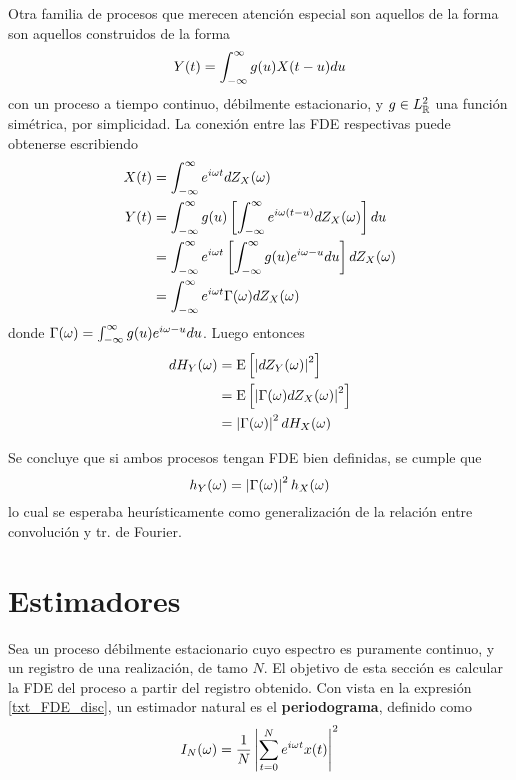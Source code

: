 Otra familia de procesos que merecen atención especial son aquellos de la forma son aquellos 
construidos de la forma
\begin{equation}
Y(t) = \int_{-\infty}^{\infty} g(u) X(t-u) du
\end{equation}
%
con \xt un proceso a tiempo continuo, débilmente estacionario, y $g\in L^{2}_{\mathbb{R}}$ una función 
simétrica, por simplicidad. 
%
La conexión entre las FDE respectivas puede obtenerse escribiendo
\begin{align*}
X(t) &= \int_{-\infty}^{\infty} e^{i \omega t }  dZ_X(\omega) \\
Y(t) &= \int_{-\infty}^{\infty} g(u) \left[ \int_{-\infty}^{\infty} e^{i \omega (t-u) }  dZ_X(\omega) \right] du \\
&= \int_{-\infty}^{\infty} e^{i \omega t } \left[ \int_{-\infty}^{\infty} g(u) e^{i \omega -u } du \right] dZ_X(\omega) \\
&= \int_{-\infty}^{\infty} e^{i \omega t } \Gamma(\omega) dZ_X(\omega)
\end{align*}
donde $\Gamma(\omega) = \int_{-\infty}^{\infty} g(u) e^{i \omega -u } du$. 
%
Luego entonces
\begin{align*}
dH_Y(\omega) &= \mathrm{E}\left[ \left| dZ_Y(\omega) \right|^{2} \right]  \\
&= \mathrm{E}\left[ \left| \Gamma(\omega) dZ_X(\omega) \right|^{2} \right]  \\
&= \left| \Gamma(\omega) \right|^{2} dH_X(\omega)
\end{align*}

Se concluye que si ambos procesos tengan FDE bien definidas, se cumple que
\begin{equation}
h_Y(\omega) = \left| \Gamma(\omega) \right|^{2} h_X(\omega)
\end{equation}
%
lo cual se esperaba heurísticamente como generalización de la relación entre convolución y tr. de
Fourier.


\section{Estimadores}

Sea \xt un proceso débilmente estacionario cuyo espectro es puramente continuo, y \xtd un registro 
de una realización, de tamo $N$. 
%
El objetivo de esta sección es calcular la FDE del proceso a partir del registro obtenido.
%
Con vista en la expresión \ref{txt_FDE_disc}, un estimador natural es el \textbf{periodograma}, 
definido como
\begin{equation}
I_N(\omega) = \frac{1}{N} \left| \sum_{t = 0}^{N} e^{i \omega t} x(t) \right|^{2}
\label{txt_periodograma}
\end{equation}

